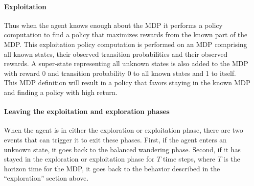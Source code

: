\paragraph{Exploitation}

Thus when the agent knows enough about the MDP it performs a policy computation
to find a policy that maximizes rewards from the known part of the MDP. This
exploitation policy computation is performed on an MDP comprising all known
states, their observed transition probabilities and their observed rewards. A
super-state representing all unknown states is also added to the MDP with
reward 0 and transition probability 0 to all known states and 1 to itself.
This MDP definition will result in a policy that favors staying in the known
MDP and finding a policy with high return.


\paragraph{Leaving the exploitation and exploration phases}

When the agent is in either the exploration or exploitation phase, there are
two events that can trigger it to exit these phases. First, if the agent enters
an unknown state, it goes back to the balanced wandering phase. Second, if it
has stayed in the exploration or exploitation phase for $T$ time steps, where
$T$ is the horizon time for the MDP, it goes back to the behavior described in
the ``exploration'' section above.

